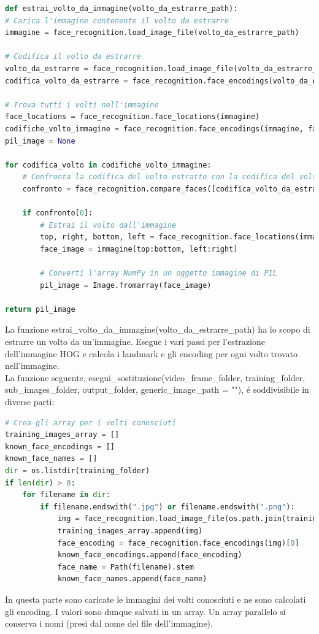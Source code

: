 \documentclass{report}
\begin{document}
\begin{lstlisting}[language=Python, breaklines=true, frame=single]
def estrai_volto_da_immagine(volto_da_estrarre_path):
# Carica l'immagine contenente il volto da estrarre
immagine = face_recognition.load_image_file(volto_da_estrarre_path)

# Codifica il volto da estrarre
volto_da_estrarre = face_recognition.load_image_file(volto_da_estrarre_path)
codifica_volto_da_estrarre = face_recognition.face_encodings(volto_da_estrarre)[0]

# Trova tutti i volti nell'immagine
face_locations = face_recognition.face_locations(immagine)
codifiche_volto_immagine = face_recognition.face_encodings(immagine, face_locations)
pil_image = None

for codifica_volto in codifiche_volto_immagine:
    # Confronta la codifica del volto estratto con la codifica del volto dall'immagine
    confronto = face_recognition.compare_faces([codifica_volto_da_estrarre], codifica_volto)

    if confronto[0]:
        # Estrai il volto dall'immagine
        top, right, bottom, left = face_recognition.face_locations(immagine)[0]
        face_image = immagine[top:bottom, left:right]

        # Converti l'array NumPy in un oggetto immagine di PIL
        pil_image = Image.fromarray(face_image)

return pil_image
\end{lstlisting}
La funzione estrai\_volto\_da\_immagine(volto\_da\_estrarre\_path) ha lo scopo di estrarre un volto da un'immagine. Esegue i vari passi per l'estrazione dell'immagine HOG e calcola i landmark e gli encoding per ogni volto trovato nell'immagine. \\

La funzione seguente, esegui\_sostituzione(video\_frame\_folder, training\_folder, sub\_images\_folder, output\_folder, generic\_image\_path = ""), é soddivisibile in diverse parti:

\begin{lstlisting}[language=Python, breaklines=true, frame=single]
# Crea gli array per i volti conosciuti
training_images_array = []
known_face_encodings = []
known_face_names = []
dir = os.listdir(training_folder)
if len(dir) > 0:
    for filename in dir:
        if filename.endswith(".jpg") or filename.endswith(".png"):
            img = face_recognition.load_image_file(os.path.join(training_folder, filename))
            training_images_array.append(img)
            face_encoding = face_recognition.face_encodings(img)[0]
            known_face_encodings.append(face_encoding)
            face_name = Path(filename).stem
            known_face_names.append(face_name)
\end{lstlisting}
In questa parte sono caricate le immagini dei volti conosciuti e ne sono calcolati gli encoding. I valori sono dunque salvati in un array. Un array parallelo si conserva i nomi (presi dal nome del file dell'immagine).
\end{document}
